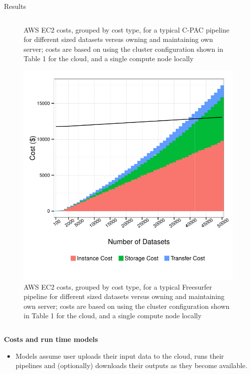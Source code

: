 \documentclass[final,hyperref={pdfpagelabels=false}]{beamer}
\begin{document}
\begin{frame}
\begin{columns}
\begin{column}{.5\textwidth}
{\begin{block}{Results}
\begin{column}{.47\textwidth}
\begin{figure}
                  \caption{\label{fig:cpac-costs}AWS EC2 costs, grouped by cost type, for a typical C-PAC pipeline for different sized datasets versus owning and maintaining own server; costs are based on using the cluster configuration shown in Table 1 for the cloud, and a single compute node locally}
              \end{figure}
              \begin{figure}
                  \includegraphics[width=.99\textwidth]{fs-costs.pdf}
                  \caption{\label{fig:fs-costs}AWS EC2 costs, grouped by cost type, for a typical Freesurfer pipeline for different sized datasets versus owning and maintaining own server; costs are based on using the cluster configuration shown in Table 1 for the cloud, and a single compute node locally}
              \end{figure}
              \end{column}
          \begin{column}{.47\textwidth}
              {\bf Costs and run time models}
              \begin{itemize}
                  \item Models assume user uploads their input data to the cloud, runs their pipelines and (optionally) downloads their outputs as they become available.

\end{itemize}
\end{column}
\end{block}}
\end{column}
\end{columns}
\end{frame}
\end{document}

